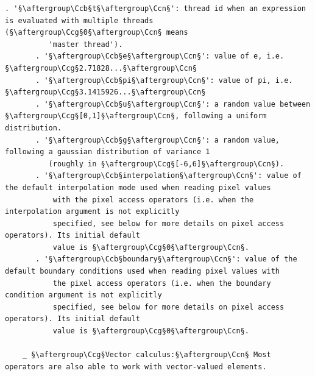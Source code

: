 \documentclass[a4paper,10.5pt,twoside]{book}
\def\Ccb{\color{cb}}
\def\Ccg{\color{cc}}
\def\Ccn{\color{black}}
\begin{document}
\begin{lstlisting}[escapechar=§]
       . '§\aftergroup\Ccb§t§\aftergroup\Ccn§': thread id when an expression is evaluated with multiple threads (§\aftergroup\Ccg§0§\aftergroup\Ccn§ means 
          'master thread'). 
       . '§\aftergroup\Ccb§e§\aftergroup\Ccn§': value of e, i.e. §\aftergroup\Ccg§2.71828...§\aftergroup\Ccn§ 
       . '§\aftergroup\Ccb§pi§\aftergroup\Ccn§': value of pi, i.e. §\aftergroup\Ccg§3.1415926...§\aftergroup\Ccn§ 
       . '§\aftergroup\Ccb§u§\aftergroup\Ccn§': a random value between §\aftergroup\Ccg§[0,1]§\aftergroup\Ccn§, following a uniform distribution. 
       . '§\aftergroup\Ccb§g§\aftergroup\Ccn§': a random value, following a gaussian distribution of variance 1 
          (roughly in §\aftergroup\Ccg§[-6,6]§\aftergroup\Ccn§). 
       . '§\aftergroup\Ccb§interpolation§\aftergroup\Ccn§': value of the default interpolation mode used when reading pixel values 
           with the pixel access operators (i.e. when the interpolation argument is not explicitly 
           specified, see below for more details on pixel access operators). Its initial default 
           value is §\aftergroup\Ccg§0§\aftergroup\Ccn§. 
       . '§\aftergroup\Ccb§boundary§\aftergroup\Ccn§': value of the default boundary conditions used when reading pixel values with 
           the pixel access operators (i.e. when the boundary condition argument is not explicitly 
           specified, see below for more details on pixel access operators). Its initial default 
           value is §\aftergroup\Ccg§0§\aftergroup\Ccn§. 
 
    _ §\aftergroup\Ccg§Vector calculus:§\aftergroup\Ccn§ Most operators are also able to work with vector-valued elements. 
 

\end{lstlisting}
\end{document}
